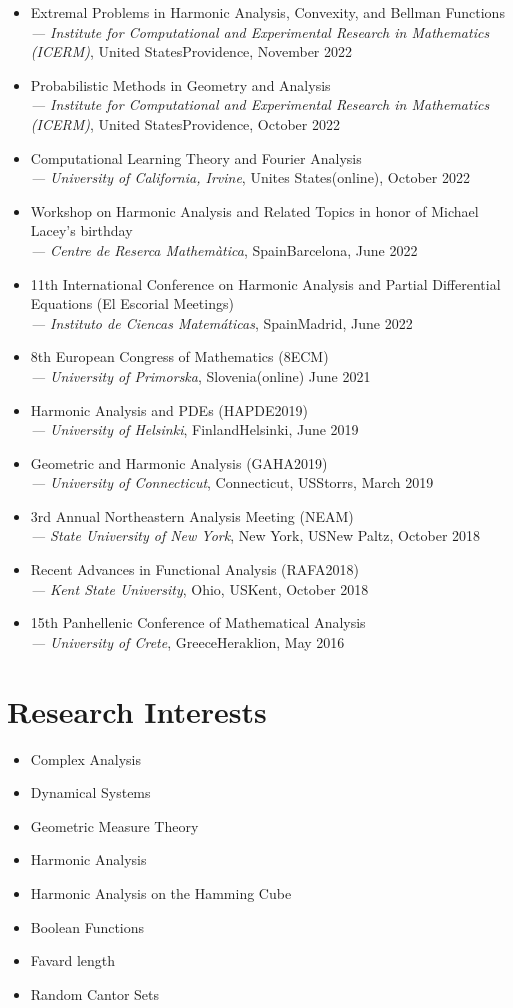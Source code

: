 \documentclass[12pt]{article}
\newcommand{\conference}[4]{#1\\ \emph{--- #2}, #3\hfill {#4}}
\begin{document}
\begin{itemize}
	\item \conference{Extremal Problems in Harmonic Analysis, Convexity, and Bellman Functions}{Institute for Computational and Experimental Research in Mathematics (ICERM)}{United States}{Providence, November 2022}
	\item \conference{Probabilistic Methods in Geometry and Analysis}{Institute for Computational and Experimental Research in Mathematics (ICERM)}{United States}{Providence, October 2022}
	\item \conference{Computational Learning Theory and Fourier Analysis}{University of California, Irvine}{Unites States}{(online), October 2022}
	\item \conference{Workshop on Harmonic Analysis and Related Topics in honor of Michael Lacey's birthday}{Centre de Reserca Mathem{\`a}tica}{Spain}{Barcelona, June 2022}
	\item \conference{11th International Conference on Harmonic Analysis and Partial Differential Equations (El Escorial Meetings)}{Instituto de Ciencas Matem{\'a}ticas}{Spain}{Madrid, June 2022}
	\item \conference{8th European Congress of Mathematics (8ECM)}{University of Primorska}{Slovenia}{(online) June 2021}
	\item \conference{Harmonic Analysis and PDEs (HAPDE2019)}{University of Helsinki}{Finland}{Helsinki, June 2019}
	\item \conference{Geometric and Harmonic Analysis (GAHA2019)}{University of Connecticut}{Connecticut, US}{Storrs, March 2019}
	\item \conference{3rd Annual Northeastern Analysis Meeting (NEAM)}{State University of New York}{New York, US}{New Paltz, October 2018}
	\item \conference{Recent Advances in Functional Analysis (RAFA2018)}{Kent State University}{Ohio, US}{Kent, October 2018}
	\item \conference{15th Panhellenic Conference of Mathematical Analysis}{University of Crete}{Greece}{Heraklion, May 2016}
\end{itemize}


\section*{Research Interests}

\begin{multicols}{2}
	\begin{itemize}
		\item Complex Analysis
		\item Dynamical Systems
		\item Geometric Measure Theory
		\item Harmonic Analysis
		\item Harmonic Analysis on the Hamming Cube
		\item Boolean Functions
		\item Favard length
		\item Random Cantor Sets
	\end{itemize}
\end{multicols}
\end{document}
